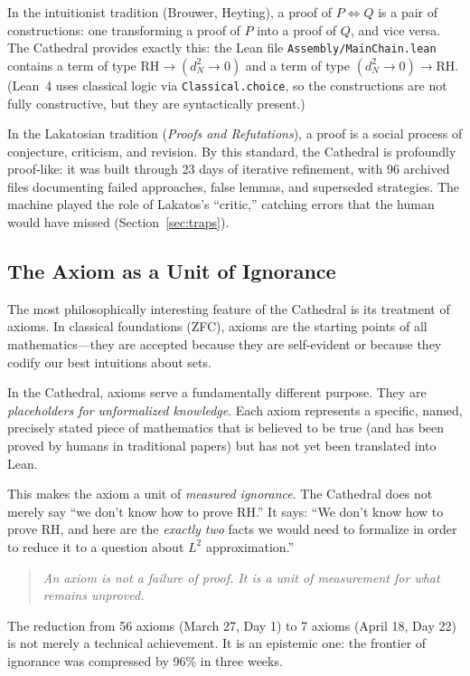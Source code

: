 \documentclass[11pt,a4paper]{article}
\newcommand{\RH}{\ensuremath{\mathrm{RH}}}
\begin{document}
In the intuitionist tradition (Brouwer, Heyting), a proof of $P \iff Q$
is a pair of constructions: one transforming a proof of $P$ into a
proof of $Q$, and vice versa. The Cathedral provides exactly this:
the Lean file \texttt{Assembly/MainChain.lean} contains a term of
type $\RH \to (d_N^2 \to 0)$ and a term of type
$(d_N^2 \to 0) \to \RH$. (Lean~4 uses classical logic via
\texttt{Classical.choice}, so the constructions are not fully
constructive, but they are syntactically present.)

In the Lakatosian tradition (\emph{Proofs and Refutations}), a proof
is a social process of conjecture, criticism, and revision. By this
standard, the Cathedral is profoundly proof-like: it was built through
23 days of iterative refinement, with 96 archived files documenting
failed approaches, false lemmas, and superseded strategies. The
machine played the role of Lakatos's ``critic,'' catching errors that
the human would have missed (Section~\ref{sec:traps}).

\subsection{The Axiom as a Unit of Ignorance}

The most philosophically interesting feature of the Cathedral is its
treatment of axioms. In classical foundations (ZFC), axioms are the
starting points of all mathematics---they are accepted because they
are self-evident or because they codify our best intuitions about
sets.

In the Cathedral, axioms serve a fundamentally different purpose. They
are \emph{placeholders for unformalized knowledge}. Each axiom
represents a specific, named, precisely stated piece of mathematics
that is believed to be true (and has been proved by humans in
traditional papers) but has not yet been translated into Lean.

This makes the axiom a unit of \emph{measured ignorance}. The
Cathedral does not merely say ``we don't know how to prove \RH.''
It says: ``We don't know how to prove \RH, and here are the
\emph{exactly two} facts we would need to formalize in order to
reduce it to a question about $L^2$ approximation.''

\begin{quote}
\emph{An axiom is not a failure of proof. It is a unit of measurement
for what remains unproved.}
\end{quote}

The reduction from 56 axioms (March 27, Day 1) to 7 axioms (April 18,
Day 22) is not merely a technical achievement. It is an epistemic
one: the frontier of ignorance was compressed by 96\% in three weeks.
\end{document}
